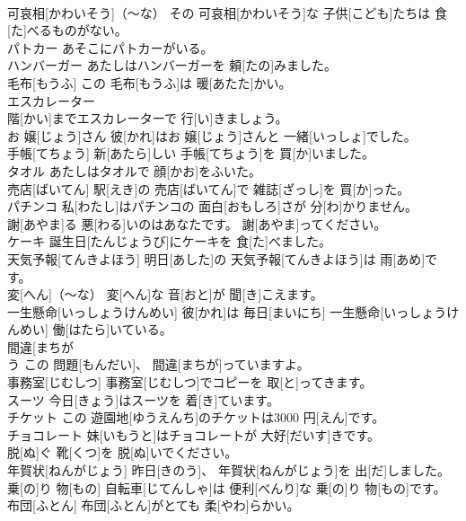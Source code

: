\documentclass[8pt]{extreport}
\begin{document}
\begin{CJK}{UTF8}{min}
\\	可哀相[かわいそう]（～な）	その 可哀相[かわいそう]な 子供[こども]たちは 食[た]べるものがない。		
\\	パトカー	あそこにパトカーがいる。		
\\	ハンバーガー	あたしはハンバーガーを 頼[たの]みました。		
\\	毛布[もうふ]	この 毛布[もうふ]は 暖[あたた]かい。		
\\	エスカレーター	
\\	階[かい]までエスカレーターで 行[い]きましょう。		
\\	お 嬢[じょう]さん	彼[かれ]はお 嬢[じょう]さんと 一緒[いっしょ]でした。		
\\	手帳[てちょう]	新[あたら]しい 手帳[てちょう]を 買[か]いました。		
\\	タオル	あたしはタオルで 顔[かお]をふいた。		
\\	売店[ばいてん]	駅[えき]の 売店[ばいてん]で 雑誌[ざっし]を 買[か]った。		
\\	パチンコ	私[わたし]はパチンコの 面白[おもしろ]さが 分[わ]かりません。		
\\	謝[あやま]る	悪[わる]いのはあなたです。 謝[あやま]ってください。		
\\	ケーキ	誕生日[たんじょうび]にケーキを 食[た]べました。		
\\	天気予報[てんきよほう]	明日[あした]の 天気予報[てんきよほう]は 雨[あめ]です。		
\\	変[へん]（～な）	変[へん]な 音[おと]が 聞[き]こえます。		
\\	一生懸命[いっしょうけんめい]	彼[かれ]は 毎日[まいにち] 一生懸命[いっしょうけんめい] 働[はたら]いている。		
\\	間違[まちが
\\	う	この 問題[もんだい]、 間違[まちが]っていますよ。		
\\	事務室[じむしつ]	事務室[じむしつ]でコピーを 取[と]ってきます。		
\\	スーツ	今日[きょう]はスーツを 着[き]ています。		
\\	チケット	この 遊園地[ゆうえんち]のチケットは3000 円[えん]です。		
\\	チョコレート	妹[いもうと]はチョコレートが 大好[だいす]きです。		
\\	脱[ぬ]ぐ	靴[くつ]を 脱[ぬ]いでください。		
\\	年賀状[ねんがじょう]	昨日[きのう]、 年賀状[ねんがじょう]を 出[だ]しました。		
\\	乗[の]り 物[もの]	自転車[じてんしゃ]は 便利[べんり]な 乗[の]り 物[もの]です。		
\\	布団[ふとん]	布団[ふとん]がとても 柔[やわ]らかい。		

\end{CJK}
\end{document}

